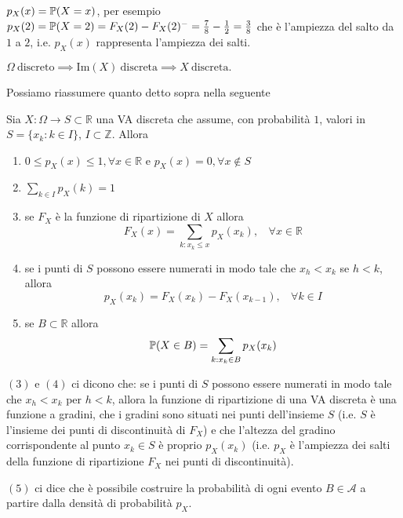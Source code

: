 $p_{X}(x) =\mathbb{P}(X=x)$, per esempio $p_{X}(2) =\mathbb{P}(X=2) =F_{X}(2) -F_{X}(2)^{-} =\frac{7}{8} -\frac{1}{2} =\frac{3}{8}$ che è l'ampiezza del salto da $1$ a $2$, i.e. $p_{X}(x)$ rappresenta l'ampiezza dei salti.
\begin{oss}
$\Omega \ \text{discreto} \implies \mathrm{Im}(X) \ \text{discreta} \implies X\ \text{discreta} .$
\end{oss}
Possiamo riassumere quanto detto sopra nella seguente
\begin{theorem}
Sia $X:\Omega \rightarrow S\subset \mathbb{R}$ una VA discreta che assume, con probabilità $1$, valori in $S=\{x_{k} :k\in I\}$, $I\subset \mathbb{Z}$. Allora
\end{theorem}
\begin{enumerate}
\item $0\leq p_{X}(x) \leq 1,\forall x\in \mathbb{R}$ e $p_{X}(x) =0,\forall x\notin S$
\item $\sum\limits_{k\in I} p_{X}(k) =1$
\item se $F_{X}$ è la funzione di ripartizione di $X$ allora
\begin{equation*}
F_{X}(x) =\sum\limits_{k:x_{k} \leq x} p_{X}(x_{k}) ,\ \ \ \ \forall x\in \mathbb{R}
\end{equation*}
\item se i punti di $S$ possono essere numerati in modo tale che $x_{h} < x_{k}$ se $h< k$, allora
\begin{equation*}
p_{X}(x_{k}) =F_{X}(x_{k}) -F_{X}(x_{k-1}) ,\ \ \ \ \forall k\in I
\end{equation*}
\item se $B\subset \mathbb{R}$ allora
\begin{equation*}
\mathbb{P}(X\in B) =\sum\limits_{k:x_{k} \in B} p_{X}(x_{k})
\end{equation*}
\end{enumerate}
\begin{oss}
$(3)$ e $(4)$ ci dicono che: se i punti di $S$ possono essere numerati in modo tale che $x_{h} < x_{k}$ per $h< k$, allora la funzione di ripartizione di una VA discreta è una funzione a gradini, che i gradini sono situati nei punti dell'insieme $S$ (i.e. $S$ è l'insieme dei punti di discontinuità di $F_{X}$) e che l'altezza del gradino corrispondente al punto $x_{k} \in S$ è proprio $p_{X}(x_{k})$ (i.e. $p_{X}$ è l'ampiezza dei salti della funzione di ripartizione $F_{X}$ nei punti di discontinuità).

$(5)$ ci dice che è possibile costruire la probabilità di ogni evento $B\in \mathcal{A}$ a partire dalla densità di probabilità $p_{X}$.
\end{oss}


